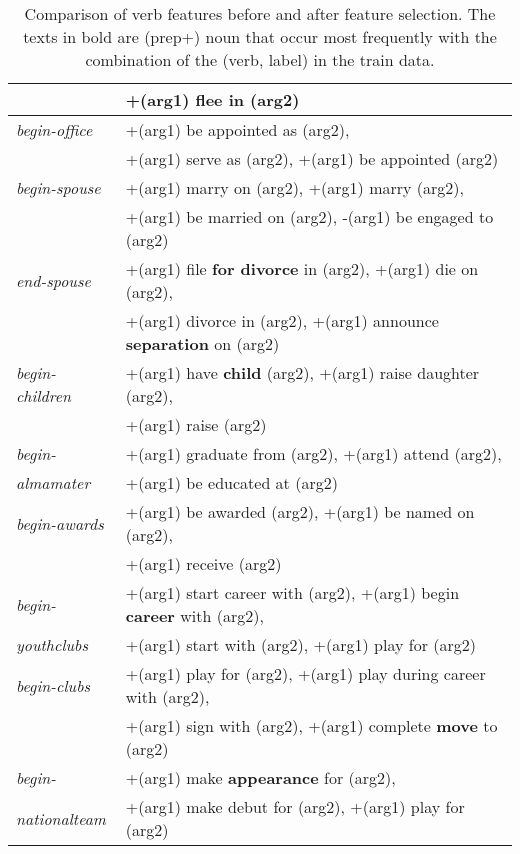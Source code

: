\begin{table}
\begin{scriptsize}
\begin{center}
\begin{tabular}{|l|l|}
& +(arg1) flee in (arg2) \\
\hline
\textit{begin-office} &+(arg1) be appointed as (arg2), \\
& +(arg1) serve as (arg2), +(arg1) be appointed (arg2) \\
\hline
\textit{begin-spouse} &+(arg1) marry on (arg2), +(arg1) marry (arg2), \\
& +(arg1) be married on (arg2), -(arg1) be engaged to (arg2) \\
\hline
\textit{end-spouse} &+(arg1) file \textbf{for divorce} in (arg2), +(arg1) die on (arg2), \\
& +(arg1) divorce in (arg2), +(arg1) announce \textbf{separation} on (arg2) \\
\hline
\textit{begin-children} &+(arg1) have \textbf{child} (arg2), +(arg1) raise daughter (arg2), \\
& +(arg1) raise (arg2) \\
\hline
\textit{begin-} &+(arg1) graduate from (arg2), +(arg1) attend (arg2), \\
\textit{almamater}& +(arg1) be educated at (arg2) \\
\hline
\textit{begin-awards} &+(arg1) be awarded (arg2), +(arg1) be named on (arg2), \\
& +(arg1) receive (arg2) \\
\hline
\textit{begin-} &+(arg1) start career with (arg2), +(arg1) begin \textbf{career} with (arg2),\\
\textit{youthclubs}& +(arg1) start with (arg2), +(arg1) play for (arg2) \\
\hline
\textit{begin-clubs} &+(arg1) play for (arg2), +(arg1) play during career with (arg2),\\
& +(arg1) sign with (arg2), +(arg1) complete \textbf{move} to (arg2) \\
\hline
\textit{begin-} &+(arg1) make \textbf{appearance} for (arg2), \\
\textit{nationalteam}& +(arg1) make debut for (arg2), +(arg1) play for (arg2) \\
\hline
\end{tabular}
\caption{\label{table:verbs} Comparison of verb features before and after feature selection. The texts in bold are (prep+) noun that occur most frequently with the combination of the (verb, label) in the train data.}
\end{center}
\end{scriptsize}
\end{table}
\normalsize
